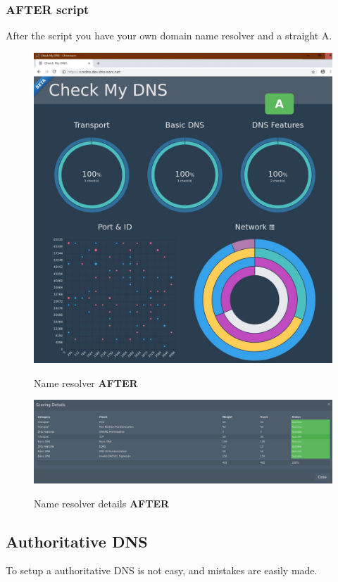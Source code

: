 \subsubsection{AFTER script}
After the script you have your own domain name resolver and a straight A.
\begin{figure}[H]
	\centering
	\includegraphics[width=0.9\linewidth]{pics/score_DNS1}
	\label{fig:scoredns1}
		\caption{Name resolver \textbf{AFTER}}
\end{figure}

\begin{figure}[H]
	\centering
	\includegraphics[width=0.9\linewidth]{pics/score_DNS2}
	\label{fig:scoredns2}
			\caption{Name resolver details \textbf{AFTER}}
\end{figure}
\newpage
\subsection{Authoritative DNS}
To setup a authoritative DNS is not easy, and mistakes are easily made. 
